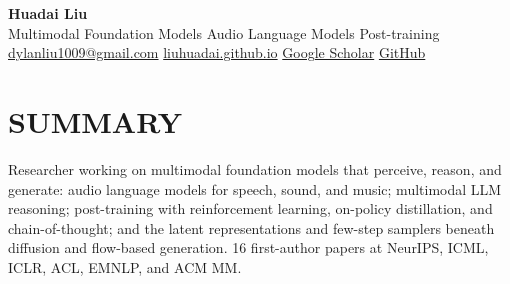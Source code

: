 \documentclass[10pt,letterpaper]{article}
\begin{document}
\color{ink}\RaggedRight\fontsize{10.4}{13}\selectfont

\begin{center}
  {\color{navy}\fontsize{28}{31}\selectfont\textbf{Huadai Liu}}\\[3pt]
  {\color{muted}\sffamily\fontsize{10.6}{13.5}\selectfont
    Multimodal Foundation Models \enspace\textbullet\enspace Audio Language Models \enspace\textbullet\enspace Post-training}\\[5pt]
  {\sffamily\fontsize{9.4}{12}\selectfont
    \href{mailto:dylanliu1009@gmail.com}{dylanliu1009@gmail.com}
    \enspace\textbar\enspace \href{https://liuhuadai.github.io/}{liuhuadai.github.io}
    \enspace\textbar\enspace \href{https://scholar.google.com/citations?user=-avcK5sAAAAJ}{Google Scholar}
    \enspace\textbar\enspace \href{https://github.com/liuhuadai}{GitHub}}
\end{center}
\vspace{-4pt}

\section{SUMMARY}
Researcher working on multimodal foundation models that perceive, reason, and generate: audio language models for speech, sound, and music; multimodal LLM reasoning; post-training with reinforcement learning, on-policy distillation, and chain-of-thought; and the latent representations and few-step samplers beneath diffusion and flow-based generation. 16 first-author papers at NeurIPS, ICML, ICLR, ACL, EMNLP, and ACM MM.
\end{document}
